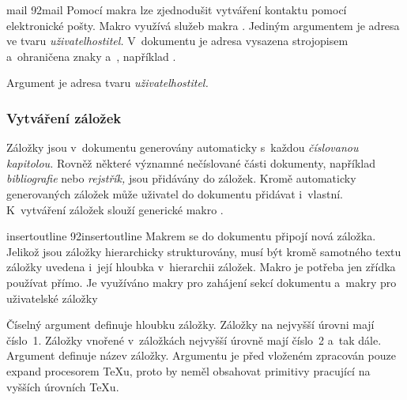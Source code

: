 \documentclass[12pt]{article}
\begin{document}
\medskip
\begin{makro}{mail}
  {\char92mail}
  Pomocí makra  lze zjednodušit vytváření kontaktu pomocí 
  elektronické pošty. Makro využívá služeb makra . Jediným argumentem
  je adresa ve tvaru \emph{uživatel\/{\rm {}}hostitel.} V~dokumentu 
  je adresa vysazena strojopisem a~ohraničena znaky 
   a~, 
  například .

  \smallskip
  Argument  je adresa tvaru \emph{uživatel\/{\rm {}}hostitel.}

  \begin{example}
  \end{example}
\end{makro}

\subsubsection*{Vytváření záložek}
Záložky jsou v~dokumentu generovány automaticky 
s~každou \emph{číslovanou kapitolou.} Rovněž některé významné nečíslované části
dokumenty, například \emph{bibliografie} nebo \emph{rejstřík,} jsou přidávány
do záložek. Kromě automaticky generovaných záložek může uživatel do dokumentu 
přidávat i~vlastní. 
K~vytváření záložek slouží generické makro .

\medskip
\begin{makro}{insertoutline}
  {\char92insertoutline}
  Makrem  se do dokumentu připojí nová záložka.
  Jelikož jsou záložky hierarchicky strukturovány, musí být kromě samotného
  textu záložky uvedena i~její hloubka v~hierarchii záložek. 
  Makro  je potřeba jen zřídka používat přímo. Je využíváno
  makry pro zahájení sekcí dokumentu a~makry pro uživatelské záložky

  \smallskip
  Číselný argument  definuje hloubku záložky. Záložky na nejvyšší
  úrovni mají číslo~1. Záložky vnořené v~záložkách nejvyšší úrovně mají číslo~2
  a~tak dále. Argument  definuje název záložky. Argumentu 
  je před vloženém zpracován pouze expand procesorem \TeX u, proto by neměl
  obsahovat primitivy pracující na vyšších úrovních \TeX u.

  \begin{example}
  \end{example}
\end{makro}
\end{document}
